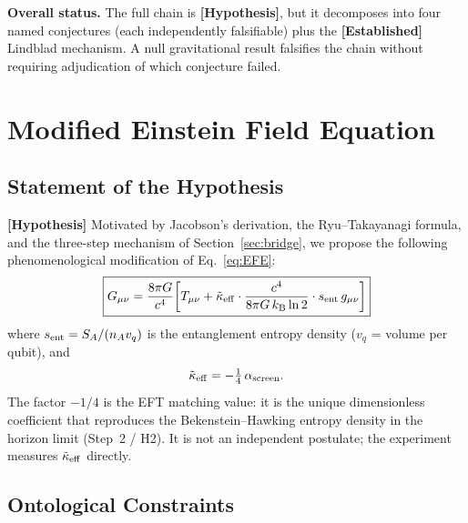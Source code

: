 \documentclass[12pt,letterpaper]{article}
\theoremstyle{definition}
\theoremstyle{remark}
\newcommand{\established}{\textbf{[Established]}}
\newcommand{\hypothesis}{\textbf{[Hypothesis]}}
\newcommand{\ascreen}{\alpha_{\rm screen}}
\newcommand{\keff}{\tilde{\kappa}_{\rm eff}}
\newcommand{\sent}{s_{\rm ent}}
\newcommand{\kB}{k_{\rm B}}
\begin{document}
\noindent\textbf{Overall status.} The full chain is \hypothesis{}, but it decomposes
into four named conjectures (each independently falsifiable) plus the \established{}
Lindblad mechanism.  A null gravitational result falsifies the chain without requiring
adjudication of which conjecture failed.

\section{Modified Einstein Field Equation}
\label{sec:EFE}

\subsection{Statement of the Hypothesis}

\hypothesis{} Motivated by Jacobson's derivation, the Ryu--Takayanagi formula, and the
three-step mechanism of Section~\ref{sec:bridge}, we propose the following
phenomenological modification of Eq.~\eqref{eq:EFE}:
\begin{equation}
\boxed{G_{\mu\nu} = \frac{8\pi G}{c^4}\!\left[
  T_{\mu\nu}
  + \keff \cdot \frac{c^4}{8\pi G\,\kB\ln 2}\cdot \sent\, g_{\mu\nu}
\right]}
\label{eq:modEFE}
\end{equation}
where $\sent = S_A/(n_A v_q)$ is the entanglement entropy density ($v_q$ = volume per
qubit), and
\begin{equation}
\keff = -\tfrac{1}{4}\,\ascreen.
\label{eq:keff}
\end{equation}
The factor $-1/4$ is the EFT matching value: it is the unique dimensionless coefficient
that reproduces the Bekenstein--Hawking entropy density in the horizon limit
(Step~2 / H2).  It is not an independent postulate; the experiment measures $\keff$
directly.

\subsection{Ontological Constraints}
\end{document}
